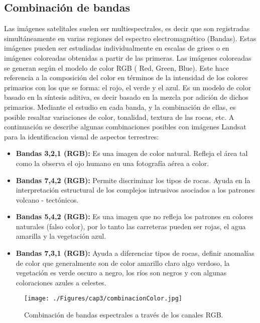 \subsection{Combinaci\'on de bandas}
Las im\'agenes satelitales suelen ser multiespectrales, es decir que son registradas simult\'aneamente en varias regiones del espectro electromagn\'etico (Bandas). Estas im\'agenes pueden ser estudiadas individualmente en escalas de grises o en im\'agenes coloreadas obtenidas a partir de las primeras. Las im\'agenes coloreadas se generan seg\'un el modelo de color RGB ( Red, Green, Blue). Este hace referencia a la composici\'on del color en t\'erminos de la intensidad de los colores primarios con los que se forma: el rojo, el verde y el azul. Es un modelo de color basado en la s\'intesis aditiva, es decir basado en la mezcla por adici\'on de dichos primarios\cite{teledet2015Combi}.
Mediante el estudio en cada banda, y la combinaci\'on de ellas, es posible resaltar variaciones de color, tonalidad, textura de las rocas, etc. A continuaci\'on se describe algunas combinaciones posibles con im\'agenes Landsat para la identificacion visual de aspectos terrestres\cite{lillesand2014remote}:
	\begin{itemize}
		\item \textbf{Bandas 3,2,1 (RGB):} Es una imagen de color natural. Refleja el \'area tal como la observa el ojo humano en una fotograf\'ia a\'erea a color.
		\item  \textbf{Bandas 7,4,2 (RGB):} Permite discriminar los tipos de rocas. Ayuda en la interpretaci\'on estructural de los complejos intrusivos asociados a los patrones volcano - tect\'onicos.
		\item  \textbf{Bandas 5,4,2 (RGB):} Es una imagen que no refleja los patrones en colores naturales (falso color), por lo tanto las carreteras pueden ser rojas, el agua amarilla y la vegetaci\'on azul.
		\item \textbf{Bandas 7,3,1 (RGB):} Ayuda a diferenciar tipos de rocas, definir anomal\'ias de color que generalmente son de color amarillo claro algo verdoso, la vegetaci\'on es verde oscuro a negro, los r\'ios son negros y con algunas coloraciones azules a celestes.		
	\end{itemize}
 
  \begin{figure}[H]
  	\centering
  	\texttt{[image: ./Figures/cap3/combinacionColor.jpg]}
  	\caption{Combinaci\'on de bandas espectrales a trav\'es de los canales RGB.}
  	\label{fig:combinacionColor}
  \end{figure}

